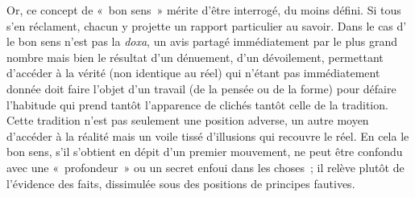 \documentclass[12pt, a4paper]{article}
\begin{document}
Or, ce concept de «~bon sens~» mérite d'être interrogé, du moins défini. Si tous s'en réclament, chacun y projette un rapport particulier au savoir. Dans le cas d'\robbe{} le bon sens n'est pas la \textit{doxa}, un avis partagé immédiatement par le plus grand nombre mais bien le résultat d'un dénuement, d'un dévoilement, permettant d'accéder à la vérité (non identique au réel) qui n'étant pas immédiatement donnée doit faire l'objet d'un travail (de la pensée ou de la forme) pour défaire l'habitude qui prend tantôt l'apparence de clichés tantôt celle de la tradition. Cette tradition n'est pas seulement une position adverse, un autre moyen d'accéder à la réalité mais un voile tissé d'illusions qui recouvre le réel. En cela le bon sens, s'il s'obtient en dépit d'un premier mouvement, ne peut être confondu avec une «~profondeur~» ou un secret enfoui dans les choses~; il relève plutôt de l'évidence des faits, dissimulée sous des positions de principes fautives. 
\end{document}
